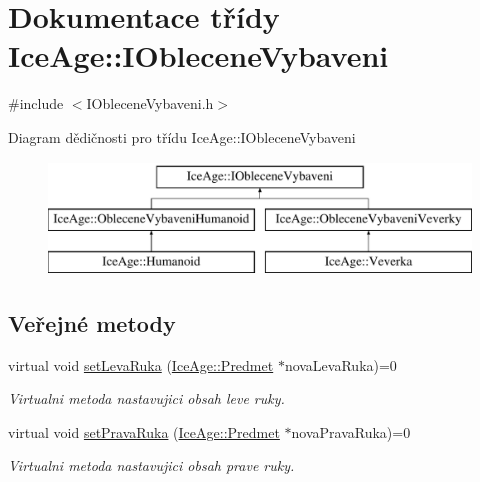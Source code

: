 \hypertarget{classIceAge_1_1IObleceneVybaveni}{}\section{Dokumentace třídy Ice\+Age\+:\+:I\+Oblecene\+Vybaveni}
\label{classIceAge_1_1IObleceneVybaveni}


{\ttfamily \#include $<$I\+Oblecene\+Vybaveni.\+h$>$}

Diagram dědičnosti pro třídu Ice\+Age\+:\+:I\+Oblecene\+Vybaveni\begin{figure}[H]
\begin{center}
\leavevmode
\includegraphics[height=3.000000cm]{d6/d4b/classIceAge_1_1IObleceneVybaveni}
\end{center}
\end{figure}
\subsection*{Veřejné metody}
\begin{DoxyCompactItemize}
\item 
virtual void \hyperlink{classIceAge_1_1IObleceneVybaveni_a7200f6920521037a3d432b6f5f3b0ae0}{set\+Leva\+Ruka} (\hyperlink{classIceAge_1_1Predmet}{Ice\+Age\+::\+Predmet} $\ast$nova\+Leva\+Ruka)=0
\begin{DoxyCompactList}\small\item\em Virtualni metoda nastavujici obsah leve ruky. \end{DoxyCompactList}\item 
virtual void \hyperlink{classIceAge_1_1IObleceneVybaveni_a50ee586bd1661e0da4e1bebdb667db21}{set\+Prava\+Ruka} (\hyperlink{classIceAge_1_1Predmet}{Ice\+Age\+::\+Predmet} $\ast$nova\+Prava\+Ruka)=0
\begin{DoxyCompactList}\small\item\em Virtualni metoda nastavujici obsah prave ruky. \end{DoxyCompactList}\end{DoxyCompactItemize}
